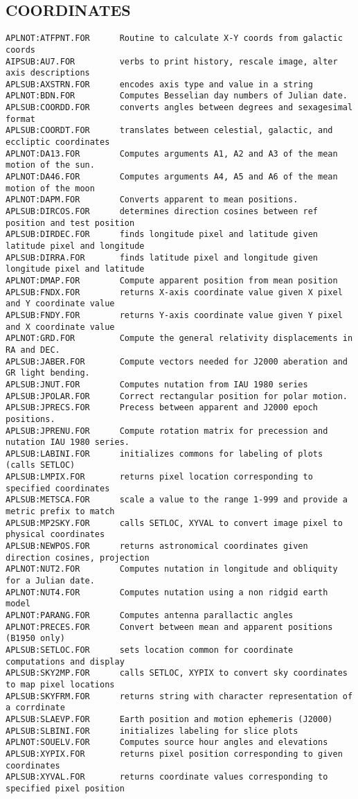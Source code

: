\subsection{COORDINATES}
\begin{verbatim}
APLNOT:ATFPNT.FOR      Routine to calculate X-Y coords from galactic coords
AIPSUB:AU7.FOR         verbs to print history, rescale image, alter axis descriptions
APLSUB:AXSTRN.FOR      encodes axis type and value in a string
APLNOT:BDN.FOR         Computes Besselian day numbers of Julian date.
APLSUB:COORDD.FOR      converts angles between degrees and sexagesimal format
APLSUB:COORDT.FOR      translates between celestial, galactic, and eccliptic coordinates
APLNOT:DA13.FOR        Computes arguments A1, A2 and A3 of the mean motion of the sun.
APLNOT:DA46.FOR        Computes arguments A4, A5 and A6 of the mean motion of the moon
APLNOT:DAPM.FOR        Converts apparent to mean positions.
APLSUB:DIRCOS.FOR      determines direction cosines between ref position and test position
APLSUB:DIRDEC.FOR      finds longitude pixel and latitude given latitude pixel and longitude
APLSUB:DIRRA.FOR       finds latitude pixel and longitude given longitude pixel and latitude
APLNOT:DMAP.FOR        Compute apparent position from mean position
APLSUB:FNDX.FOR        returns X-axis coordinate value given X pixel and Y coordinate value
APLSUB:FNDY.FOR        returns Y-axis coordinate value given Y pixel and X coordinate value
APLNOT:GRD.FOR         Compute the general relativity displacements in RA and DEC.
APLSUB:JABER.FOR       Compute vectors needed for J2000 aberation and GR light bending.
APLSUB:JNUT.FOR        Computes nutation from IAU 1980 series
APLSUB:JPOLAR.FOR      Correct rectangular position for polar motion.
APLSUB:JPRECS.FOR      Precess between apparent and J2000 epoch positions.
APLSUB:JPRENU.FOR      Compute rotation matrix for precession and nutation IAU 1980 series.
APLSUB:LABINI.FOR      initializes commons for labeling of plots (calls SETLOC)
APLSUB:LMPIX.FOR       returns pixel location corresponding to specified coordinates
APLSUB:METSCA.FOR      scale a value to the range 1-999 and provide a metric prefix to match
APLSUB:MP2SKY.FOR      calls SETLOC, XYVAL to convert image pixel to physical coordinates
APLSUB:NEWPOS.FOR      returns astronomical coordinates given direction cosines, projection
APLNOT:NUT2.FOR        Computes nutation in longitude and obliquity for a Julian date.
APLNOT:NUT4.FOR        Computes nutation using a non ridgid earth model
APLNOT:PARANG.FOR      Computes antenna parallactic angles
APLNOT:PRECES.FOR      Convert between mean and apparent positions (B1950 only)
APLSUB:SETLOC.FOR      sets location common for coordinate computations and display
APLSUB:SKY2MP.FOR      calls SETLOC, XYPIX to convert sky coordinates to map pixel locations
APLSUB:SKYFRM.FOR      returns string with character representation of a corrdinate
APLSUB:SLAEVP.FOR      Earth position and motion ephemeris (J2000)
APLSUB:SLBINI.FOR      initializes labeling for slice plots
APLNOT:SOUELV.FOR      Computes source hour angles and elevations
APLSUB:XYPIX.FOR       returns pixel position corresponding to given coordinates
APLSUB:XYVAL.FOR       returns coordinate values corresponding to specified pixel position
\end{verbatim}
 
